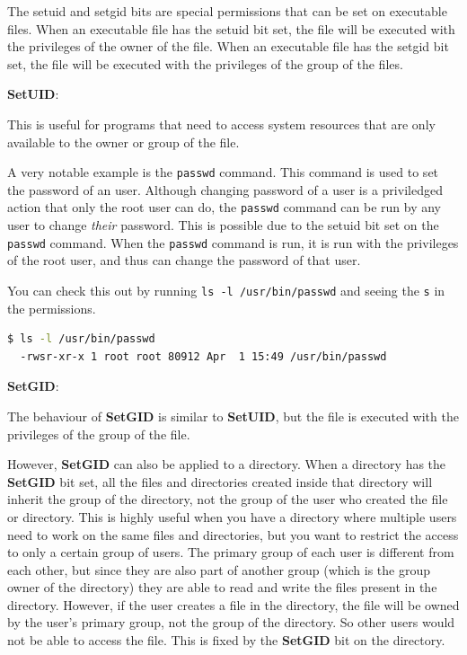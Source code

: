 \begin{definition}
  The setuid and setgid bits are special permissions that can be set on executable files.
  When an executable file has the setuid bit set, the file will be executed with the privileges of the owner of the file.
  When an executable file has the setgid bit set, the file will be executed with the privileges of the group of the files.
\end{definition}

\textbf{SetUID}:

This is useful for programs that need to access system resources that are only available to the owner or group of the file.

A very notable example is the \texttt{passwd} command.
This command is used to set the password of an user.
Although changing password of a user is a priviledged action that only the root user can do, the \texttt{passwd} command can be run by any user to change \textit{their} password.
This is possible due to the setuid bit set on the \texttt{passwd} command.
When the \texttt{passwd} command is run, it is run with the privileges of the root user, and thus can change the password of that user.

You can check this out by running \texttt{ls -l /usr/bin/passwd} and seeing the \texttt{s} in the permissions.

\begin{lstlisting}[language=bash]
  $ ls -l /usr/bin/passwd
  -rwsr-xr-x 1 root root 80912 Apr  1 15:49 /usr/bin/passwd
\end{lstlisting}

\textbf{SetGID}:

The behaviour of \textbf{SetGID} is similar to \textbf{SetUID}, but the file is executed with the privileges of the group of the file.

However, \textbf{SetGID} can also be applied to a directory.
When a directory has the \textbf{SetGID} bit set, all the files and directories created inside that directory will inherit the group of the directory, not the group of the user who created the file or directory.
This is highly useful when you have a directory where multiple users need to work on the same files and directories, but you want to restrict the access to only a certain group of users.
The primary group of each user is different from each other, but since they are also part of another group (which is the group owner of the directory) they are able to read and write the files present in the directory.
However, if the user creates a file in the directory, the file will be owned by the user's primary group, not the group of the directory.
So other users would not be able to access the file.
This is fixed by the \textbf{SetGID} bit on the directory.

